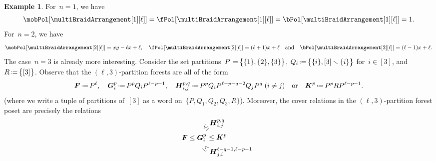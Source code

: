 \documentclass{amsart}
\theoremstyle{definition}
\newtheorem{example}[theorem]{Example}
\renewcommand{\b}[1]{{\boldsymbol{#1}}} %
\newcommand{\ssm}{\smallsetminus} %
\newcommand{\eqdef}{\mbox{\,\raisebox{0.2ex}{\scriptsize\ensuremath{\mathrm:}}\ensuremath{=}\,}} %
\renewcommand{\b}[1]{\boldsymbol{#1}} %
\begin{document}
\begin{example}
For~$n = 1$, we have
\[
\mobPol[{\multiBraidArrangement[1][\ell]}] = \fPol[{\multiBraidArrangement[1][\ell]}] = \bPol[{\multiBraidArrangement[1][\ell]}] = 1.
\]
For~$n = 2$, we have
\[
\mobPol[{\multiBraidArrangement[2][\ell]}] = xy-\ell x+\ell,
\quad
\fPol[{\multiBraidArrangement[2][\ell]}] = (\ell+1)x+\ell
\quad\text{and}\quad
\bPol[{\multiBraidArrangement[2][\ell]}] = (\ell-1)x+\ell.
\]
The case~$n = 3$ is already more interesting.
Consider the set partitions~$P \eqdef \big\{ \{1\}, \{2\}, \{3\} \big\}$, $Q_i \eqdef \big\{ \{i\}, [3] \ssm \{i\} \big\}$ for~$i \in [3]$, and~$R \eqdef \big\{ [3] \big\}$.
Observe that the $(\ell,3)$-partition forests are all of the form
\begin{gather*}
\b{F} \eqdef P^\ell,
\quad
\b{G}_i^p \eqdef P^p Q_i P^{\ell-p-1}, %
\quad
\b{H}_{i,j}^{p,q} \eqdef P^p Q_i P^{\ell-p-q-2} Q_j P^q \;\text{($i \ne j$)} %
\quad\text{or}\quad
\b{K}^p \eqdef P^p R P^{\ell-p-1}. %
\end{gather*}
(where we write a tuple of partitions of~$[3]$ as a word on~$\{P, Q_1, Q_2, Q_3, R\}$). %
Moreover, the cover relations in the $(\ell,3)$-partition forest poset are precisely the relations
\[
\b{F} \le \b{G}_i^p \hspace{-.4cm} \begin{array}{l} \rotatebox[origin=c]{45}{$\le$} \raisebox{.2cm}{$\b{H}_{i,j}^{p,q}$} \\[.1cm] \quad \le \b{K}^p \\[.1cm] \rotatebox[origin=c]{-45}{$\le$} \raisebox{-.2cm}{$\b{H}_{j,i}^{\ell-q-1, \ell-p-1}$} \end{array}
\]
\end{example}
\end{document}
